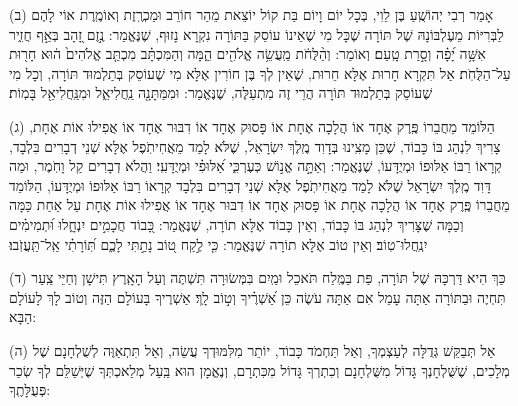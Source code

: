 \documentclass[twoside, openany, parskip=half, 11pt]{book}
\begin{document}
(ב)
 אָמַר רְבִי יְהוֹשֻֽׁעַ בֶּן לֵוִי, בְּכָל יוֹם וָיוֹם בַּת קוֹל יוֹצֵאת מֵהַר חוֹרֵב וּמַכְרֶֽזֶת וְאוֹמֶֽרֶת אוֹי לָהֶם לַבְּרִיּוֹת מֵעֶלְבּוֹנָהּ שֶׁל תּוֹרָה שֶׁכָּל מִי שֶׁאֵינוֹ עוֹסֵק בַּתּוֹרָה נִקְרָא נָזוּף, שֶׁנֶּאֱמַר:  נֶ֣זֶם זָ֭הָב בְּאַ֣ף חֲזִ֑יר אִשָּׁ֥ה יָ֝פָ֗ה וְסָ֣רַת טָֽעַם׃             וְאוֹמֵר:  וְהַ֨לֻּחֹ֔ת מַֽעֲשֵׂ֥ה אֱלֹהִ֖ים הֵ֑מָּה וְהַמִּכְתָּ֗ב מִכְתַּ֤ב אֱלֹהִים֙ ה֔וּא חָר֖וּת עַל־הַלֻּחֹֽת׃ אַל תִּקְרָא חָרוּת אֶלָּא חֵרוּת, שֶׁאֵין לְךָ בֶּן חוֹרִין אֶלָּא מִי שֶׁעוֹסֵק בְּתַלְמוּד תּוֹרָה, וְכָל מִי שֶׁעוֹסֵק בְּתַלְמוּד תּוֹרָה הֲרֵי זֶה מִתְעַלֶּה,             שֶׁנֶּאֱמַר:  וּמִמַּתָּנָ֖ה נַֽחֲלִיאֵ֑ל וּמִנַּֽחֲלִיאֵ֖ל בָּמֽוֹת׃

(ג)
 הַלּוֹמֵד מֵחֲבֵרוֹ פֶּֽרֶק אֶחָד אוֹ הֲלָכָה אֶחָת אוֹ פָּסוּק אֶחָד אוֹ דִבּוּר אֶחָד אוֹ אֲפִילוּ אוֹת אֶחָת, צָרִיךְ לִנְהַג בּוֹ כָּבוֹד, שֶׁכֵּן מָצִֽינוּ בְּדָוִד מֶֽלֶךְ יִשְׂרָאֵל, שֶׁלֹּא לָמַד מֵאֲחִיתֹֽפֶל אֶלָּא שְׁנֵי דְבָרִים בִּלְבָד, קְרָאוֹ רַבּוֹ אַלּוּפוֹ וּמְיֻדָּעוֹ,               שֶׁנֶּאֱמַר:  וְאַתָּ֣ה אֱנ֣וֹשׁ כְּעֶרְכִּ֑י אַ֝לּוּפִ֗י וּמְיֻדָּעִֽי׃ וַהֲלֹא דְבָרִים קַל וָחֹֽמֶר, וּמַה דָּוִד מֶֽלֶךְ יִשְׂרָאֵל שֶׁלֹּא לָמַד מֵאֲחִיתֹֽפֶל אֶלָּא שְׁנֵי דְבָרִים בִּלְבָד קְרָאוֹ רַבּוֹ אַלּוּפוֹ וּמְיֻדָּעוֹ, הַלּוֹמֵד מֵחֲבֵרוֹ פֶּֽרֶק אֶחָד אוֹ הֲלָכָה אֶחָת אוֹ פָּסוּק אֶחָד אוֹ דִבּוּר אֶחָד אוֹ אֲפִילוּ אוֹת אֶחָת עַל אַחַת כַּמָּה וְכַמָּה שֶׁצָּרִיךְ לִנְהַג בּוֹ כָּבוֹד, וְאֵין כָּבוֹד אֶלָּא תוֹרָה, שֶׁנֶּאֱמַר:  כָּ֭בוֹד חֲכָמִ֣ים יִנְחָ֑לוּ  וּ֝תְמִימִ֗ים יִנְֽחֲלוּ־טֽוֹב׃ וְאֵין טוֹב אֶלָּא תוֹרָה שֶׁנֶּאֱמַר:  כִּ֤י לֶ֣קַח ט֭וֹב נָתַ֣תִּי לָכֶ֑ם תּֽ֝וֹרָתִ֗י אַֽל־תַּֽעֲזֹֽבוּ׃

(ד)
 כַּךְ הִיא דַּרְכָּהּ שֶׁל תּוֹרָה, פַּת בַּמֶּֽלַח תֹּאכֵל וּמַֽיִם בִּמְּשׂוּרָה תִּשְׁתֶּה וְעַל הָאָֽרֶץ תִּישָׁן וְחַיֵּי צַֽעַר תִּחְיֶה וּבַתּוֹרָה אַתָּה עָמֵל אִם אַתָּה עֹשֶׂה כֵּן  אַ֝שְׁרֶ֗יךָ וְט֣וֹב לָֽךְ׃ אַשְׁרֶיךָ בָּעוֹלָם הַזֶּה וְטוֹב לָךְ לָעוֹלָם הַבָּא: 

(ה)
 אַל תְּבַקֵּשׁ גְּדֻלָּה לְעַצְמְךָ, וְאַל תַּחְמֹד כָּבוֹד, יוֹתֵר מִלִּמּוּדְךָ עֲשֵׂה, וְאַל תִּתְאַוֶּה לְשֻׁלְחָנָם שֶׁל מְלָכִים, שֶׁשֻּׁלְחָנְךָ גָּדוֹל מִשֻּׁלְחָנָם וְכִתְרְךָ גָּדוֹל מִכִּתְרָם, וְנֶאֱמָן הוּא בַּֽעַל מְלַאכְתְּךָ שֶׁיְּשַׁלֵּם לְךָ שְׂכַר פְּעֻלָּתֶֽךָ: 
\end{document}
